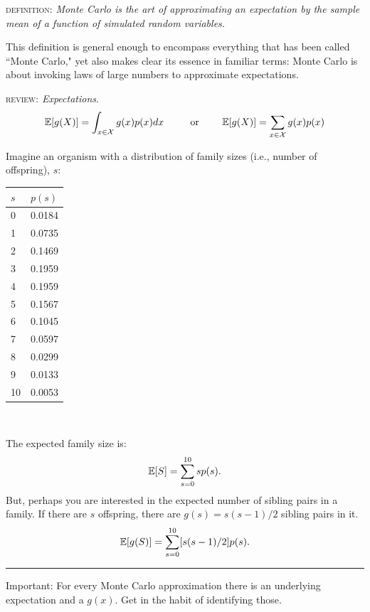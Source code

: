 \textsc{definition}: {\sl Monte Carlo is the art of approximating an expectation by the sample mean of a function of simulated random variables.}

This definition is general enough to encompass everything that has been called ``Monte Carlo," yet also makes clear its essence in familiar terms: Monte Carlo is about invoking laws of large numbers to approximate expectations.

\textsc{review:} {\sl Expectations}.
\[
\Bbb{E}[g(X)]= \int_{x\in\mathcal{X}} g(x)p(x)dx~~~~~~~~
\mathrm{or}~~~~~~~
\Bbb{E}[g(X)] = \sum_{x\in\mathcal{X}} g(x)p(x)
\]



\vspace*{-1.3em}

\enlargethispage*{1000pt}
Imagine an organism with a distribution of family sizes (i.e., number of offspring), $s$:

\begin{minipage}{0.3\textwidth}
\begin{tabular}{ll}
$s$ & $p(s)$  \\ \hline
0 & 0.0184 \\
1 & 0.0735 \\
2 & 0.1469 \\
3 & 0.1959 \\
4 & 0.1959 \\
5 & 0.1567 \\
6 & 0.1045 \\ 
7 & 0.0597 \\
8 & 0.0299 \\
9 & 0.0133 \\
10 & 0.0053
\end{tabular}
\end{minipage}
~~
\begin{minipage}{0.68\textwidth}
The expected family size is:
$$
\Bbb{E}[S] = \sum_{s = 0}^{10} s p(s).
$$
But, perhaps you are interested in the expected number of
sibling pairs in a family.  If there are $s$ offspring, there are
$g(s) = s (s - 1) / 2$ sibling pairs in it.
$$
\Bbb{E}[g(S)] = \sum_{s = 0}^{10} [s(s-1)/2] p(s).
$$
\end{minipage}

\hrule
Important: For every Monte Carlo approximation there is an underlying expectation and a $g(x)$.  Get in the habit of identifying those.


